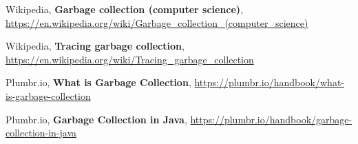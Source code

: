 \documentclass[12pt,a4paper]{article}
\begin{document}
\begin{thebibliography}{9}

  Wikipedia,
  \textbf{Garbage collection (computer science)},
  \url{https://en.wikipedia.org/wiki/Garbage_collection_(computer_science)}

  Wikipedia,
  \textbf{Tracing garbage collection},
  \url{https://en.wikipedia.org/wiki/Tracing_garbage_collection}

  Plumbr.io,
  \textbf{What is Garbage Collection},
  \url{https://plumbr.io/handbook/what-is-garbage-collection}

  Plumbr.io,
  \textbf{Garbage Collection in Java},
  \url{https://plumbr.io/handbook/garbage-collection-in-java}

\end{thebibliography}
\end{document}
